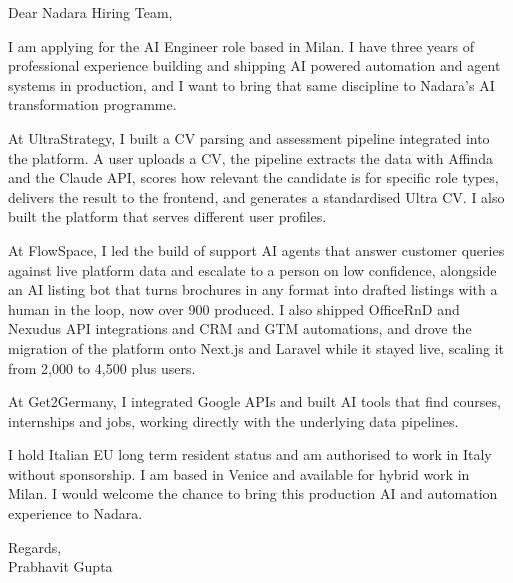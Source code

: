 \documentclass[a4paper,11pt]{article}
\begin{document}
Dear Nadara Hiring Team,

I am applying for the AI Engineer role based in Milan. I have three years of professional experience building and shipping AI powered automation and agent systems in production, and I want to bring that same discipline to Nadara's AI transformation programme.

At UltraStrategy, I built a CV parsing and assessment pipeline integrated into the platform. A user uploads a CV, the pipeline extracts the data with Affinda and the Claude API, scores how relevant the candidate is for specific role types, delivers the result to the frontend, and generates a standardised Ultra CV. I also built the platform that serves different user profiles.

At FlowSpace, I led the build of support AI agents that answer customer queries against live platform data and escalate to a person on low confidence, alongside an AI listing bot that turns brochures in any format into drafted listings with a human in the loop, now over 900 produced. I also shipped OfficeRnD and Nexudus API integrations and CRM and GTM automations, and drove the migration of the platform onto Next.js and Laravel while it stayed live, scaling it from 2,000 to 4,500 plus users.

At Get2Germany, I integrated Google APIs and built AI tools that find courses, internships and jobs, working directly with the underlying data pipelines.

I hold Italian EU long term resident status and am authorised to work in Italy without sponsorship. I am based in Venice and available for hybrid work in Milan. I would welcome the chance to bring this production AI and automation experience to Nadara.

Regards,\\
Prabhavit Gupta
\end{document}

